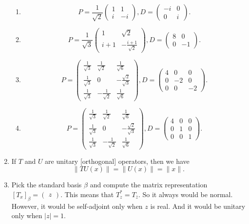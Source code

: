 \begin{enumerate}
\begin{enumerate}
\item \[P=\frac{1}{\sqrt{2}}\begin{pmatrix}1&1\\i&-i\end{pmatrix}, D=\begin{pmatrix}-i&0\\0&i\end{pmatrix}.\]
\item \[P=\frac{1}{\sqrt{3}}\begin{pmatrix}1&\sqrt{2}\\i+1&-\frac{i+1}{\sqrt{2}}\end{pmatrix}, D=\begin{pmatrix}8&0\\0&-1\end{pmatrix}.\]
\item \[P=\begin{pmatrix}\frac{1}{\sqrt{3}}&\frac{1}{\sqrt{2}}&\frac{1}{\sqrt{6}}\\\frac{1}{\sqrt{3}}&0&-\frac{\sqrt{2}}{\sqrt{3}}\\\frac{1}{\sqrt{3}}&-\frac{1}{\sqrt{2}}&\frac{1}{\sqrt{6}} \end{pmatrix}, D=\begin{pmatrix}4&0&0\\0&-2&0\\0&0&-2 \end{pmatrix}.\]
\item \[P=\begin{pmatrix}\frac{1}{\sqrt{3}}&\frac{1}{\sqrt{2}}&\frac{1}{\sqrt{6}}\\\frac{1}{\sqrt{3}}&0&-\frac{\sqrt{2}}{\sqrt{3}}\\\frac{1}{\sqrt{3}}&-\frac{1}{\sqrt{2}}&\frac{1}{\sqrt{6}} \end{pmatrix}, D=\begin{pmatrix}4&0&0\\0&1&0\\0&0&1 \end{pmatrix}.\]
\end{enumerate}
\item If $T$ and $U$ are unitary [orthogonal] operators, then we have 
\[\|TU(x)\|=\|U(x)\|=\|x\|.\]
\item Pick the standard basis $\beta $ and compute the matrix representation $[T_x]_{\beta}=\begin{pmatrix}z\end{pmatrix}$. This means that $T_z^*=T_{\overline{z}}$. So it always would be normal. However, it would be self-adjoint only when $z$ is real. And it would be unitary only when $|z|=1$.

\end{enumerate}
